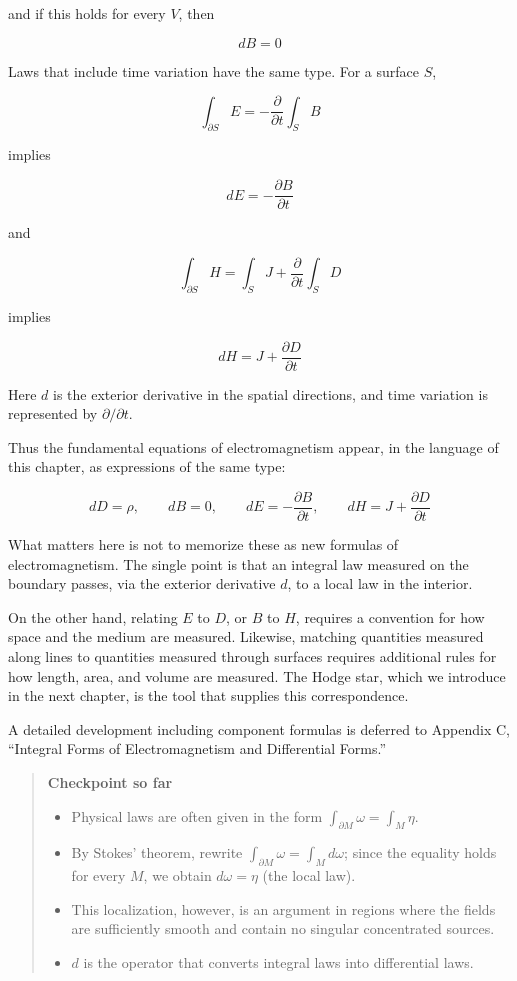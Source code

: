\documentclass[a4paper,12pt,openany]{book}
\begin{document}
and if this holds for every \(V\), then

\[
dB=0
\]

Laws that include time variation have the same type. For a surface
\(S\),

\[
\int_{\partial S}E
=
-\frac{\partial}{\partial t}\int_S B
\]

implies

\[
dE=-\frac{\partial B}{\partial t}
\]

and

\[
\int_{\partial S}H
=
\int_S J+\frac{\partial}{\partial t}\int_S D
\]

implies

\[
dH=J+\frac{\partial D}{\partial t}
\]

Here \(d\) is the exterior derivative in the spatial directions, and
time variation is represented by \(\partial/\partial t\).

Thus the fundamental equations of electromagnetism appear, in the
language of this chapter, as expressions of the same type:

\[
dD=\rho,\qquad
dB=0,\qquad
dE=-\frac{\partial B}{\partial t},\qquad
dH=J+\frac{\partial D}{\partial t}
\]

What matters here is not to memorize these as new formulas of
electromagnetism. The single point is that an integral law measured on
the boundary passes, via the exterior derivative \(d\), to a local law
in the interior.

On the other hand, relating \(E\) to \(D\), or \(B\) to \(H\), requires
a convention for how space and the medium are measured. Likewise,
matching quantities measured along lines to quantities measured through
surfaces requires additional rules for how length, area, and volume are
measured. The Hodge star, which we introduce in the next chapter, is the
tool that supplies this correspondence.

A detailed development including component formulas is deferred to
Appendix C, ``Integral Forms of Electromagnetism and Differential
Forms.''

\begin{quote}
\textbf{Checkpoint so far}

\begin{itemize}
\item
  Physical laws are often given in the form
  \(\int_{\partial M} \omega = \int_M \eta\).
\item
  By Stokes' theorem, rewrite
  \(\int_{\partial M} \omega = \int_M d\omega\); since the equality
  holds for every \(M\), we obtain \(d\omega = \eta\) (the local law).
\item
  This localization, however, is an argument in regions where the fields
  are sufficiently smooth and contain no singular concentrated sources.
\item
  \(d\) is the operator that converts integral laws into differential
  laws.
\end{itemize}
\end{quote}
\end{document}
